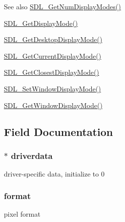 \begin{DoxySeeAlso}{See also}
\hyperlink{_s_d_l__video_8h_a5abcf18592f00019c517e791f8ba53fc}{S\+D\+L\+\_\+\+Get\+Num\+Display\+Modes()} 

\hyperlink{_s_d_l__video_8h_a0a53e003ec6ad24dd2bbbcd0ad297311}{S\+D\+L\+\_\+\+Get\+Display\+Mode()} 

\hyperlink{_s_d_l__video_8h_ab97bca68fc068a6ecc3db473c4c0defd}{S\+D\+L\+\_\+\+Get\+Desktop\+Display\+Mode()} 

\hyperlink{_s_d_l__video_8h_a14dce1cb33085b36f08d27b3d8f2335b}{S\+D\+L\+\_\+\+Get\+Current\+Display\+Mode()} 

\hyperlink{_s_d_l__video_8h_a794be92ee0a9efca226fa19a635fa470}{S\+D\+L\+\_\+\+Get\+Closest\+Display\+Mode()} 

\hyperlink{_s_d_l__video_8h_a2ca17d1e857d1560738e002c9935088a}{S\+D\+L\+\_\+\+Set\+Window\+Display\+Mode()} 

\hyperlink{_s_d_l__video_8h_a8185547bc7cb0bbeb400f459792d081a}{S\+D\+L\+\_\+\+Get\+Window\+Display\+Mode()} 
\end{DoxySeeAlso}


\subsection{Field Documentation}
\subsubsection[{\texorpdfstring{driverdata}{driverdata}}]{$\ast$ driverdata}\hypertarget{struct_s_d_l___display_mode_a9171ccac35ae6bd1b4984ad1166a8743}{}\label{struct_s_d_l___display_mode_a9171ccac35ae6bd1b4984ad1166a8743}
driver-\/specific data, initialize to 0 
\subsubsection[{\texorpdfstring{format}{format}}]{ format}\hypertarget{struct_s_d_l___display_mode_a564cec93e3c28ae1ff8340e1079ff385}{}\label{struct_s_d_l___display_mode_a564cec93e3c28ae1ff8340e1079ff385}
pixel format 
